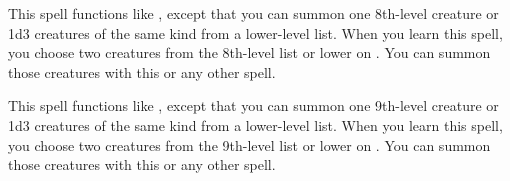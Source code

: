 \spelleffect This spell functions like , except that you can summon one 8th-level creature or 1d3 creatures of the same kind from a lower-level list. When you learn this spell, you choose two creatures from the 8th-level list or lower on . You can summon those creatures with this or any other  spell.

\spelleffect This spell functions like , except that you can summon one 9th-level creature or 1d3 creatures of the same kind from a lower-level list. When you learn this spell, you choose two creatures from the 9th-level list or lower on . You can summon those creatures with this or any other  spell.

